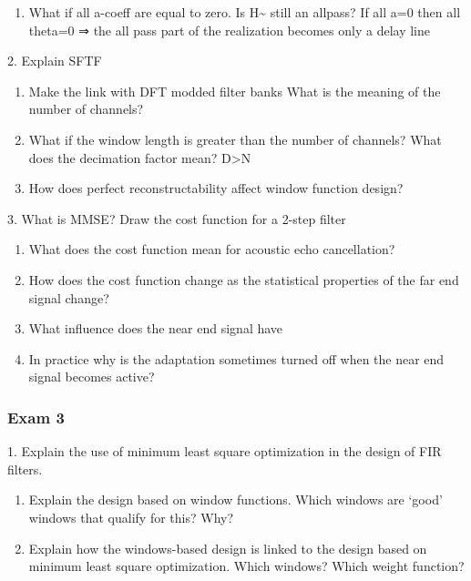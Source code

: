 \documentclass[
  a4paper,
  ,captions=tableheading
]{scrartcl}
\providecommand{\tightlist}{%
  \setlength{\itemsep}{0pt}\setlength{\parskip}{0pt}}
\begin{document}
\begin{enumerate}
\def\labelenumi{\arabic{enumi}.}
\tightlist
\item
  What if all a-coeff are equal to zero. Is H\textasciitilde{} still an
  allpass? If all a=0 then all theta=0 ⇒ the all pass part of the
  realization becomes only a delay line
\end{enumerate}

2. Explain SFTF

\begin{enumerate}
\def\labelenumi{\arabic{enumi}.}
\tightlist
\item
  Make the link with DFT modded filter banks What is the meaning of the
  number of channels?\\
\item
  What if the window length is greater than the number of channels? What
  does the decimation factor mean? D\textgreater N\\
\item
  How does perfect reconstructability affect window function design?
\end{enumerate}

3. What is MMSE? Draw the cost function for a 2-step filter

\begin{enumerate}
\def\labelenumi{\arabic{enumi}.}
\tightlist
\item
  What does the cost function mean for acoustic echo cancellation?\\
\item
  How does the cost function change as the statistical properties of the
  far end signal change?\\
\item
  What influence does the near end signal have\\
\item
  In practice why is the adaptation sometimes turned off when the near
  end signal becomes active?
\end{enumerate}

\subsubsection{Exam 3}\label{exam-3}

1. Explain the use of minimum least square optimization in the design of
FIR filters.

\begin{enumerate}
\def\labelenumi{\arabic{enumi}.}
\tightlist
\item
  Explain the design based on window functions. Which windows are `good'
  windows that qualify for this? Why?\\
\item
  Explain how the windows-based design is linked to the design based on
  minimum least square optimization. Which windows? Which weight
  function?
\end{enumerate}
\end{document}
